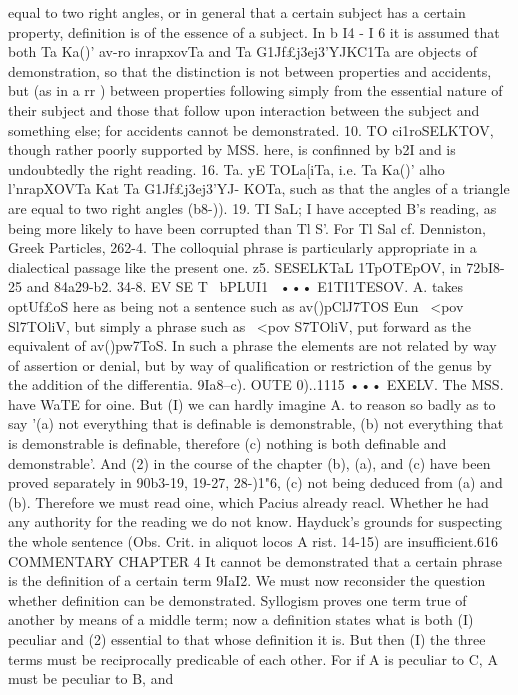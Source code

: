 {{{{{{{{{{{{{{{{{{{{{equal to two right angles, or in general that a certain subject has
a certain property, definition is of the essence of a subject. In
b I4 - I 6 it is assumed that both Ta Ka()' av-ro inrapxovTa and Ta
G1Jf£j3ej3'YJKC1Ta are objects of demonstration, so that the distinction
is not between properties and accidents, but (as in a rr ) between
properties following simply from the essential nature of their
subject and those that follow upon interaction between the subject
and something else; for accidents cannot be demonstrated.
10. TO ci1roSELKTOV, though rather poorly supported by MSS.
here, is confinned by b2I and is undoubtedly the right reading.
16. Ta. yE TOLa[iTa, i.e. Ta Ka()' alho l'nrapXOVTa Kat Ta G1Jf£j3ej3'YJ-
KOTa, such as that the angles of a triangle are equal to two right
angles (b8-{)).
19. TI SaL; I have accepted B's reading, as being more likely
to have been corrupted than Tl S'. For Tl Sal cf. Denniston, Greek
Particles, 262-4. The colloquial phrase is particularly appropriate
in a dialectical passage like the present one.
z5. SESELKTaL 1TpOTEpOV, in 72bI8-25 and 84a29-b2.
34-8. EV SE T~ bPLUI1~ ••• E1TI1TESOV. A. takes optUf£oS here as
being not a sentence such as av()pClJ7TOS Eun ~<pov Sl7TOliV, but simply
a phrase such as ~<pov S{7TOliV, put forward as the equivalent of
av()pw7ToS. In such a phrase the elements are not related by way
of assertion or denial, but by way of qualification or restriction
of the genus by the addition of the differentia.
9Ia8--c). OUTE 0)..1115 ••• EXELV. The MSS. have WaTE for oine.
But (I) we can hardly imagine A. to reason so badly as to say
'(a) not everything that is definable is demonstrable, (b) not
everything that is demonstrable is definable, therefore (c) nothing
is both definable and demonstrable'. And (2) in the course of the
chapter (b), (a), and (c) have been proved separately in 90b3-19,
19-27, 28-{)1"6, (c) not being deduced from (a) and (b). Therefore
we must read oine, which Pacius already reacl. Whether he had
any authority for the reading we do not know. Hayduck's
grounds for suspecting the whole sentence (Obs. Crit. in aliquot
locos A rist. 14-15) are insufficient.616
COMMENTARY
CHAPTER 4
It cannot be demonstrated that a certain phrase is the definition
of a certain term
9IaI2. We must now reconsider the question whether definition
can be demonstrated. Syllogism proves one term true of another
by means of a middle term; now a definition states what is both
(I) peculiar and (2) essential to that whose definition it is. But
then (I) the three terms must be reciprocally predicable of each
other. For if A is peculiar to C, A must be peculiar to B, and
}}}}}}}}}}}}}}}}}}}}}}}}
